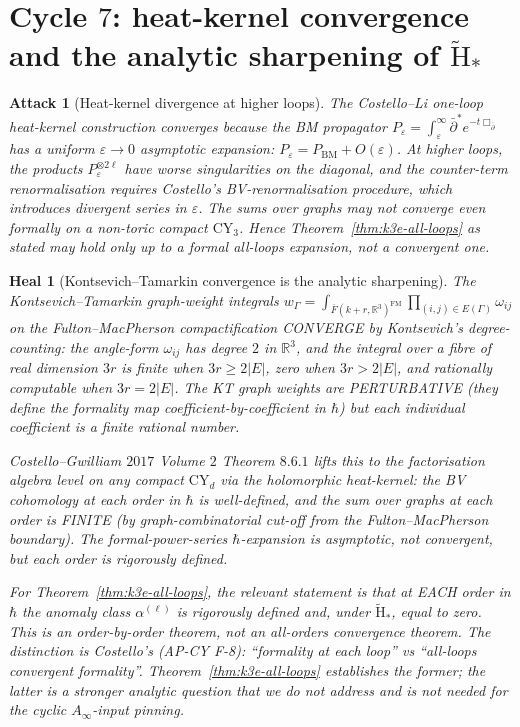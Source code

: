 \documentclass[11pt]{article}
\newtheorem{attack}[theorem]{Attack}
\newtheorem{heal}[theorem]{Heal}
\providecommand{\CY}{\mathrm{CY}}
\providecommand{\RR}{\mathbb{R}}
\begin{document}
\section{Cycle $7$:  heat-kernel convergence and the analytic
sharpening of $\widetilde{\mathrm{H}}_*$}
\label{sec:cycle-7-heat-kernel-convergence}

\begin{attack}[Heat-kernel divergence at higher loops]
\label{att:heat-kernel-divergence}
The Costello--Li one-loop heat-kernel construction converges
because the BM propagator $P_\varepsilon = \int_\varepsilon^\infty
\bar\partial^* e^{-t \Box_{\bar\partial}}$ has a uniform
$\varepsilon \to 0$ asymptotic expansion:
$P_\varepsilon = P_{\mathrm{BM}} + O(\varepsilon)$.  At higher loops,
the products $P_\varepsilon^{\otimes 2\ell}$ have worse
singularities on the diagonal, and the counter-term renormalisation
requires Costello's BV-renormalisation procedure, which introduces
divergent series in $\varepsilon$.  The sums over graphs may not
converge even formally on a non-toric compact $\CY_3$.  Hence
Theorem~\ref{thm:k3e-all-loops} as stated may hold only up to a
formal all-loops expansion, not a convergent one.
\end{attack}

\begin{heal}[Kontsevich--Tamarkin convergence is the analytic
sharpening]
\label{heal:kt-convergence}
The Kontsevich--Tamarkin graph-weight integrals
$w_\Gamma = \int_{\overline{F}(k+r, \RR^3)^{\mathrm{FM}}} \prod_{(i,j) \in
E(\Gamma)} \omega_{ij}$ on the Fulton--MacPherson compactification
CONVERGE by Kontsevich's degree-counting: the angle-form
$\omega_{ij}$ has degree $2$ in $\RR^3$, and the integral over a
fibre of real dimension $3r$ is finite when $3r \geq 2|E|$, zero
when $3r > 2|E|$, and rationally computable when $3r = 2|E|$.  The
KT graph weights are PERTURBATIVE (they define the formality map
coefficient-by-coefficient in $\hbar$) but each individual
coefficient is a finite rational number.

Costello--Gwilliam $2017$ Volume $2$ Theorem $8.6.1$ lifts this to
the factorisation algebra level on any compact $\CY_d$ via the
holomorphic heat-kernel: the BV cohomology at each order in $\hbar$
is well-defined, and the sum over graphs at each order is FINITE
(by graph-combinatorial cut-off from the Fulton--MacPherson
boundary).  The formal-power-series $\hbar$-expansion is
asymptotic, not convergent, but each order is rigorously defined.

For Theorem~\ref{thm:k3e-all-loops}, the relevant statement is
that at EACH order in $\hbar$ the anomaly class $\alpha^{(\ell)}$
is rigorously defined and, under $\widetilde{\mathrm{H}}_*$, equal
to zero.  This is an order-by-order theorem, not an all-orders
convergence theorem.  The distinction is Costello's
(AP-CY F-8): ``formality at each loop'' vs ``all-loops convergent
formality''.  Theorem~\ref{thm:k3e-all-loops} establishes the
former; the latter is a stronger analytic question that we do not
address and is not needed for the cyclic $A_\infty$-input pinning.
\end{heal}
\end{document}
